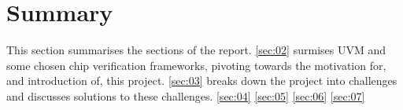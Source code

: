 \section{Summary}\label{sec:01}
This section summarises the sections of the report.\newline
\cref{sec:02} surmises UVM and some chosen chip verification frameworks, pivoting towards the motivation for, and introduction of, this project.\newline
\cref{sec:03} breaks down the project into challenges and discusses solutions to these challenges.\newline
\cref{sec:04}
\cref{sec:05}
\cref{sec:06}
\cref{sec:07}
